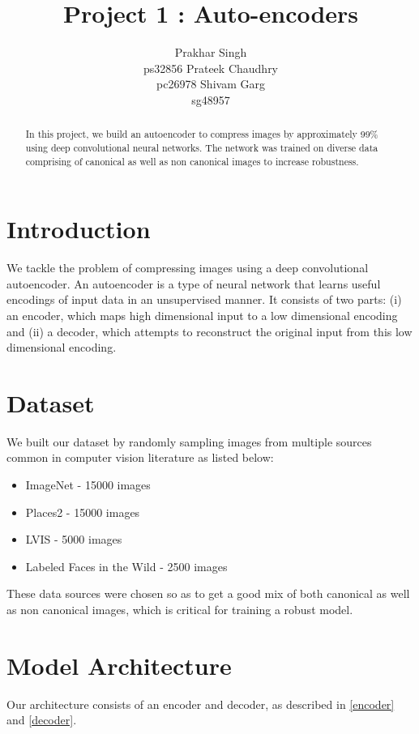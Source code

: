 \documentclass[11pt,a4paper]{article}
\title{Project 1 : Auto-encoders}
\author{Prakhar Singh \\
  ps32856 \And
  Prateek Chaudhry \\
  pc26978 \And
  Shivam Garg \\ sg48957}
\date{}
\begin{document}
\maketitle
\begin{abstract}
In this project, we build an autoencoder to compress images by approximately 99\% using deep convolutional neural networks. The network was trained on diverse data comprising of canonical as well as non canonical images to increase robustness.
\end{abstract}

\section{Introduction}

We tackle the problem of compressing images using a deep convolutional autoencoder. An autoencoder is a type of neural network that learns useful encodings of input data in an unsupervised manner. It consists of two parts: (i) an encoder, which maps high dimensional input to a low dimensional encoding and (ii) a decoder, which attempts to reconstruct the original input from this low dimensional encoding.

\section{Dataset}
We built our dataset by randomly sampling images from multiple sources common in computer vision literature as listed below:
\begin{itemize}
    \item ImageNet \cite{imagenet_cvpr09} - 15000 images
    \item Places2 \cite{zhou2014learning} - 15000 images
    \item LVIS \cite{Gupta_2019_CVPR} - 5000 images
    \item Labeled Faces in the Wild \cite{LFWTech} - 2500 images
\end{itemize}
These data sources were chosen so as to get a good mix of both canonical as well as non canonical images, which is critical for training a robust model.

\section{Model Architecture}

Our architecture consists of an encoder and decoder, as described in \autoref{encoder} and \autoref{decoder}. 
\end{document}
